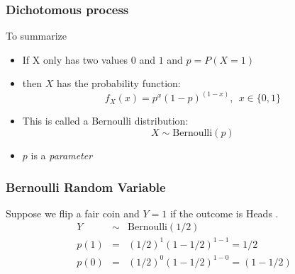 \documentclass{beamer}
\numberwithin{equation}{section}
\begin{document}
\begin{frame}
\frametitle{Dichotomous process}

To summarize
\begin{itemize}
\item If X only has two values $0$ and $1$ and $p=P(X=1)$
\item[] then $X$ has the probability function:
$$f_X(x)=p^x(1-p)^{(1-x)},\ \ x\in \{0,1\}$$
\pause
\item This is called a Bernoulli distribution:
$$X\sim \text{Bernoulli}(p)$$
\item $p$ is a \emph{parameter}
\end{itemize}
\end{frame}



\begin{frame}
\frametitle{Bernoulli Random Variable}

Suppose we flip a fair coin and $Y = 1$ if the outcome is Heads . \\

\begin{eqnarray}
Y & \sim & \text{Bernoulli}(1/2) \nonumber \\
p(1) & = & (1/2)^{1} (1- 1/2)^{ 1- 1} = 1/2 \nonumber \\
p(0) & = & (1/2)^{0} (1- 1/2)^{1 - 0} = (1- 1/2) \nonumber 
\end{eqnarray}



\end{frame}
\end{document}
